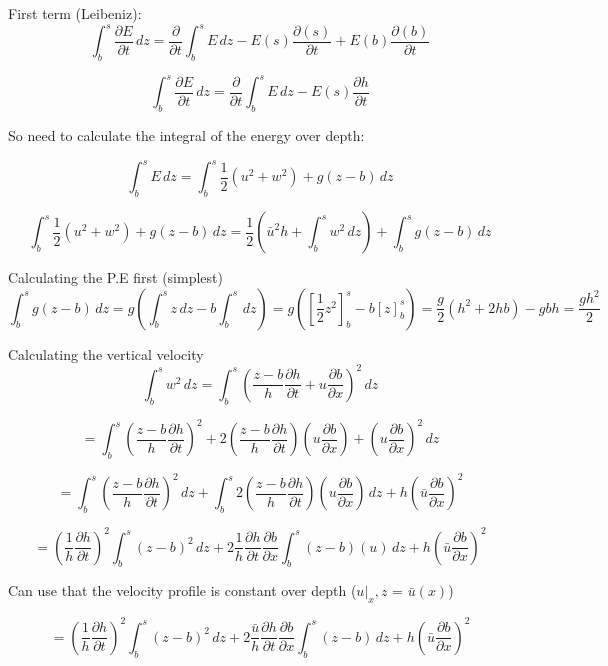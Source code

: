 \documentclass[12pt]{article}
\begin{document}
First term (Leibeniz):
\[\int_b^{s} \frac{\partial E}{\partial t} \, dz = \frac{\partial}{\partial t}\int_b^{s}E \, dz - E(s)\frac{\partial(s)}{\partial t} + E(b)\frac{\partial(b)}{\partial t}  \]

\[\int_b^{s} \frac{\partial E}{\partial t} \, dz = \frac{\partial}{\partial t}\int_b^{s}E \, dz - E(s)\frac{\partial h}{\partial t}  \]

So need to calculate the integral of the energy over depth:

\[\int_b^sE \, dz = \int_b^s \frac{1}{2}\left(u^2 + w^2\right) + g(z-b) \, dz\]

\[\int_b^s \frac{1}{2}\left(u^2+ w^2\right) + g(z-b) \, dz = \frac{1}{2}\left(\bar{u}^2h + \int_b^s  w^2 \, dz \right) + \int_b^s g(z-b) \, dz \]

Calculating the P.E first (simplest)
\[\int_b^s g(z -b) \, dz = g\left(\int_b^s z \, dz - b\int_b^s \, dz\right) = g\left(\left[\frac{1}{2}z^2\right]^s_b - b\left[z\right]^s_b\right) = \frac{g}{2}\left(h^2 + 2hb\right) - gbh =\frac{gh^2}{2} \]

Calculating the vertical velocity
\[\int_b^s  w^2 \, dz = \int_b^s  \left(\frac{z - b}{h} \frac{\partial h}{\partial t} + u \frac{\partial b}{\partial x}\right)^2 \, dz \]

\[ = \int_b^s  \left(\frac{z - b}{h} \frac{\partial h}{\partial t}\right)^2 + 2\left(\frac{z - b}{h} \frac{\partial h}{\partial t}\right)\left(u \frac{\partial b}{\partial x}\right) + \left( u \frac{\partial b}{\partial x} \right)^2 \, dz  \]

\[ = \int_b^s  \left(\frac{z - b}{h} \frac{\partial h}{\partial t}\right)^2  \, dz  +  \int_b^s 2\left(\frac{z - b}{h} \frac{\partial h}{\partial t}\right)\left(u \frac{\partial b}{\partial x}\right)  \, dz  + h\left( \bar{u} \frac{\partial b}{\partial x} \right)^2 \]

\[ = \left( \frac{1}{h}\frac{\partial h}{\partial t}\right)^2 \int_b^s  \left(z- b\right)^2  \, dz  +  2\frac{1}{h}\frac{\partial h}{\partial t}\frac{\partial b}{\partial x}\int_b^s \left(z - b\right)\left(u \right)  \, dz  + h\left( \bar{u} \frac{\partial b}{\partial x} \right)^2 \]

Can use that the velocity profile is constant over depth ($u|_x,z$ = $\bar{u}(x)$)

\[ = \left( \frac{1}{h}\frac{\partial h}{\partial t}\right)^2 \int_b^s  \left(z- b\right)^2  \, dz  +  2\frac{\bar{u}}{h}\frac{\partial h}{\partial t}\frac{\partial b}{\partial x}\int_b^s \left(z - b\right)  \, dz  + h\left( \bar{u} \frac{\partial b}{\partial x} \right)^2 \]
\end{document}

